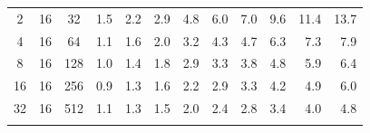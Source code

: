 \documentclass[mathserif]{beamer}
\begin{document}
\begin{frame}
\begin{table}
\begin{tabular}{cccrrrrrrrrr}
	  2& 16& 32	&  1.5 	&  2.2 	&  2.9 	&  4.8  &  6.0  &  7.0  &  9.6  & 11.4  & 13.7  \\
	  4& 16& 64	&  1.1 	&  1.6 	&  2.0 	&  3.2  &  4.3  &  4.7  &  6.3  &  7.3  &  7.9  \\
	  8& 16&128	&  1.0 	&  1.4 	&  1.8 	&  2.9  &  3.3  &  3.8  &  4.8  &  5.9  &  6.4  \\
	 16& 16&256	&  0.9 	&  1.3 	&  1.6 	&  2.2  &  2.9  &  3.3  &  4.2  &  4.9  &  6.0  \\
	 32& 16&512	&  1.1 	&  1.3 	&  1.5 	&  2.0  &  2.4  &  2.8  &  3.4  &  4.0  &  4.8  \\
	   &   &   	&      	&      	&      	&    	&    	&	&	&	&	\\
	\hline                                                                           
	\hline
    \end{tabular}
    \end{table}
\end{frame}
\end{document}
